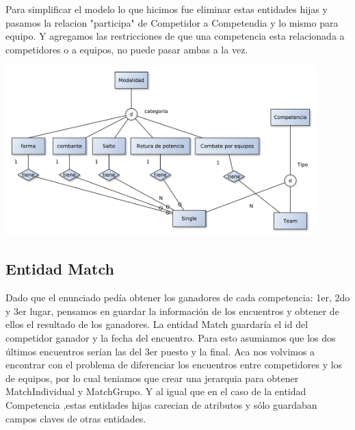 Para simplificar el modelo lo que hicimos fue eliminar estas entidades hijas y pasamos la relacion "participa" de Competidor a Competendia y lo mismo para equipo. Y agregamos las restricciones de que una competencia esta relacionada a competidores o a equipos, no puede pasar ambas a la vez.

\begin{center}
\includegraphics[width=12cm,keepaspectratio]{./imagenes/des1.pdf}\newline
\end{center}

\subsection{Entidad Match}

Dado que el enunciado ped\'ia obtener los ganadores de cada competencia: 1er, 2do y 3er lugar, pensamos en guardar la informaci\'on de los encuentros y obtener de ellos el resultado de los ganadores. La entidad Match guardar\'ia el id del competidor ganador y la fecha del encuentro. Para esto asumiamos que los dos \'ultimos encuentros ser\'ian las del 3er puesto y la final. Aca nos volvimos a encontrar con el problema de diferenciar los encuentros entre competidores y los de equipos, por lo cual teniamos que crear una jerarquia para obtener MatchIndividual y MatchGrupo. Y al igual que en el caso de la entidad Competencia ,estas entidades hijas carecian de atributos y s\'olo guardaban campos claves de otras entidades.

